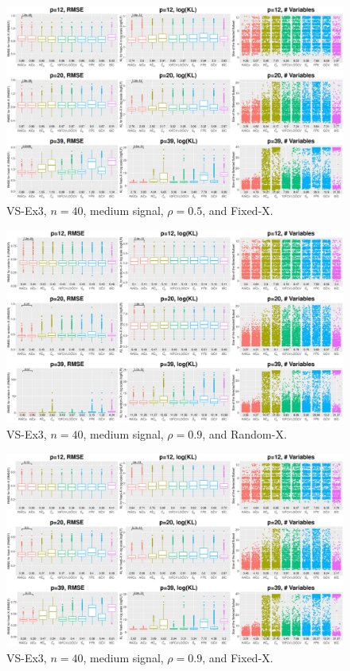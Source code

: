 \begin{figure}[!ht]
\centering
\includegraphics[width=\textwidth]{figures/supplement/fixedx_VS-Ex3_n40_msnr_rho05.eps}
\caption{VS-Ex3, $n=40$, medium signal, $\rho=0.5$, and Fixed-X.}
\end{figure}
\clearpage
\begin{figure}[!ht]
\centering
\includegraphics[width=\textwidth]{figures/supplement/randomx_VS-Ex3_n40_msnr_rho09.eps}
\caption{VS-Ex3, $n=40$, medium signal, $\rho=0.9$, and Random-X.}
\end{figure}
\begin{figure}[!ht]
\centering
\includegraphics[width=\textwidth]{figures/supplement/fixedx_VS-Ex3_n40_msnr_rho09.eps}
\caption{VS-Ex3, $n=40$, medium signal, $\rho=0.9$, and Fixed-X.}
\end{figure}

